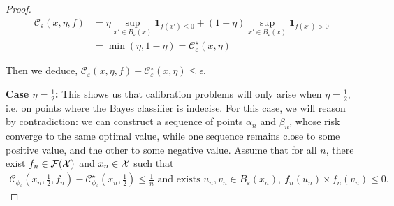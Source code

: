 \begin{proof}
    \begin{align*}
       \mathcal{C}_{\varepsilon}(x,\eta,f)& = \eta \sup_{x'\in B_\varepsilon(x)} \mathbf{1}_{f(x')\leq 0 } +(1-\eta) \sup_{x'\in B_\varepsilon(x)} \mathbf{1}_{f(x')> 0 }\\
       & = \min(\eta,1-\eta)
        = \mathcal{C}_{\varepsilon}^\star(x,\eta)
    \end{align*}
    
    
    Then we deduce, $\mathcal{C}_{\varepsilon}(x,\eta,f) - \mathcal{C}_{\varepsilon}^\star(x,\eta)\leq \epsilon$.
    
    \medskip
    
    \textbf{Case $\eta=\frac12$:} This shows us that calibration problems will only arise when $\eta = \frac{1}{2}$, i.e. on points where the Bayes classifier is indecise. For this case, we will reason by contradiction: we can construct a sequence of points $\alpha_n$ and $\beta_n$, whose risk converge to the same optimal value, while one sequence remains close to some positive value, and the other to some negative value. Assume that for all $n$, there exist $f_n\in\mathcal{F}(\mathcal{X})$ and $x_n\in\mathcal{X}$ such that 
    \begin{align*}
        \mathcal{C}_{\phi_\varepsilon}(x_n,\frac12,f_n) - \mathcal{C}_{\phi_\varepsilon}^\star(x_n,\frac12)\leq \frac1n\text{ and exists $u_n,v_n\in B_\varepsilon(x_n)$},~ f_n(u_n)\times f_n(v_n)\leq 0.
    \end{align*}
    

\end{proof}

